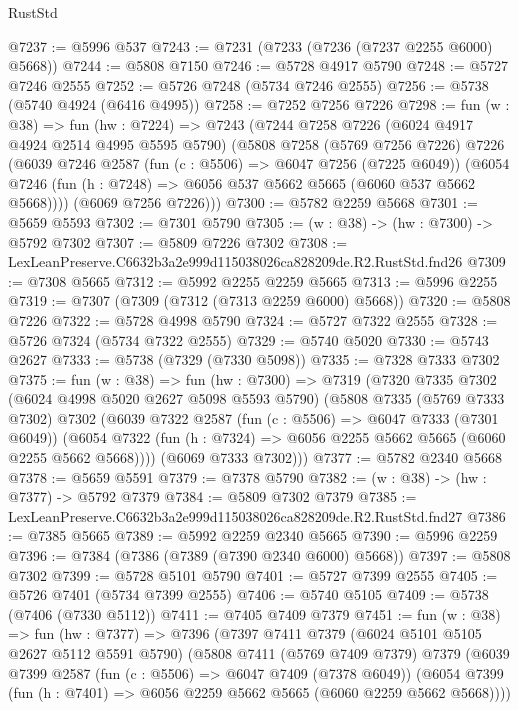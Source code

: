 \begin{lexlean}{RustStd}
\begin{coremodule}
@7237 := @5996 @537
@7243 := @7231 (@7233 (@7236 (@7237 @2255 @6000) @5668))
@7244 := @5808 @7150
@7246 := @5728 @4917 @5790
@7248 := @5727 @7246 @2555
@7252 := @5726 @7248 (@5734 @7246 @2555)
@7256 := @5738 (@5740 @4924 (@6416 @4995))
@7258 := @7252 @7256 @7226
@7298 := fun (w : @38) =>
  fun (hw : @7224) =>
  @7243
    (@7244
      @7258
      @7226
      (@6024 @4917 @4924 @2514 @4995 @5595 @5790)
      (@5808
        @7258
        (@5769 @7256 @7226)
        @7226
        (@6039
          @7246
          @2587
          (fun (c : @5506) => @6047 @7256 (@7225 @6049))
          (@6054 @7246 (fun (h : @7248) => @6056 @537 @5662 @5665 (@6060 @537 @5662 @5668))))
        (@6069 @7256 @7226)))
@7300 := @5782 @2259 @5668
@7301 := @5659 @5593
@7302 := @7301 @5790
@7305 := (w : @38) -> (hw : @7300) -> @5792 @7302
@7307 := @5809 @7226 @7302
@7308 := LexLeanPreserve.C6632b3a2e999d115038026ca828209de.R2.RustStd.fnd26
@7309 := @7308 @5665
@7312 := @5992 @2255 @2259 @5665
@7313 := @5996 @2255
@7319 := @7307 (@7309 (@7312 (@7313 @2259 @6000) @5668))
@7320 := @5808 @7226
@7322 := @5728 @4998 @5790
@7324 := @5727 @7322 @2555
@7328 := @5726 @7324 (@5734 @7322 @2555)
@7329 := @5740 @5020
@7330 := @5743 @2627
@7333 := @5738 (@7329 (@7330 @5098))
@7335 := @7328 @7333 @7302
@7375 := fun (w : @38) =>
  fun (hw : @7300) =>
  @7319
    (@7320
      @7335
      @7302
      (@6024 @4998 @5020 @2627 @5098 @5593 @5790)
      (@5808
        @7335
        (@5769 @7333 @7302)
        @7302
        (@6039
          @7322
          @2587
          (fun (c : @5506) => @6047 @7333 (@7301 @6049))
          (@6054 @7322 (fun (h : @7324) => @6056 @2255 @5662 @5665 (@6060 @2255 @5662 @5668))))
        (@6069 @7333 @7302)))
@7377 := @5782 @2340 @5668
@7378 := @5659 @5591
@7379 := @7378 @5790
@7382 := (w : @38) -> (hw : @7377) -> @5792 @7379
@7384 := @5809 @7302 @7379
@7385 := LexLeanPreserve.C6632b3a2e999d115038026ca828209de.R2.RustStd.fnd27
@7386 := @7385 @5665
@7389 := @5992 @2259 @2340 @5665
@7390 := @5996 @2259
@7396 := @7384 (@7386 (@7389 (@7390 @2340 @6000) @5668))
@7397 := @5808 @7302
@7399 := @5728 @5101 @5790
@7401 := @5727 @7399 @2555
@7405 := @5726 @7401 (@5734 @7399 @2555)
@7406 := @5740 @5105
@7409 := @5738 (@7406 (@7330 @5112))
@7411 := @7405 @7409 @7379
@7451 := fun (w : @38) =>
  fun (hw : @7377) =>
  @7396
    (@7397
      @7411
      @7379
      (@6024 @5101 @5105 @2627 @5112 @5591 @5790)
      (@5808
        @7411
        (@5769 @7409 @7379)
        @7379
        (@6039
          @7399
          @2587
          (fun (c : @5506) => @6047 @7409 (@7378 @6049))
          (@6054 @7399 (fun (h : @7401) => @6056 @2259 @5662 @5665 (@6060 @2259 @5662 @5668))))

\end{coremodule}
\end{lexlean}
